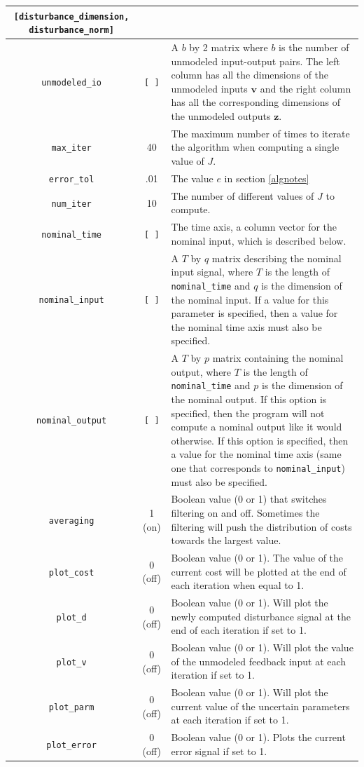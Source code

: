 \documentclass{article}
\begin{document}
\begin{table}[H]
\begin{center}
\begin{tabular}{| c | c | p{9cm} |}
\texttt{[disturbance\_dimension, disturbance\_norm]} \\
\hline
\texttt{unmodeled\_io} & \texttt{[ ]} & A $b$ by 2 matrix where $b$ is the
number of unmodeled input-output pairs. The left column has all the dimensions
of the unmodeled inputs $\mathbf{v}$ and the right column has all the
corresponding dimensions of the unmodeled outputs $\mathbf{z}$.\\
\hline
\texttt{max\_iter} & 40 & The maximum number of times to iterate the algorithm
when computing a single value of $J$.\\
\hline
\texttt{error\_tol} & .01 & The value $e$ in section \ref{algnotes} \\
\hline
\texttt{num\_iter} & 10 & The number of different values of $J$ to compute. \\
\hline
\texttt{nominal\_time} & \texttt{[ ]} & The time axis, a column vector for the
nominal input, which is described below. \\
\hline
\texttt{nominal\_input} & \texttt{[ ]} & A $T$ by $q$ matrix describing the
nominal input signal, where $T$ is the length of \texttt{nominal\_time} and $q$
is the dimension of the nominal input. If a value for this parameter is
specified, then a value for the nominal time axis must also be specified. \\
\hline
\texttt{nominal\_output} & \texttt{[ ]} & A $T$ by $p$ matrix containing the
nominal output, where $T$ is the length of \texttt{nominal\_time} and $p$ is the
dimension of the nominal output. If this option is specified, then the program
will not compute a nominal output like it would otherwise. If this option is
specified, then a value for the nominal time axis (same one that corresponds to
\texttt{nominal\_input}) must also be specified.\\
\hline
\texttt{averaging} & 1 (on) & Boolean value (0 or 1) that switches filtering on
and off. Sometimes the filtering will push the distribution of costs towards the
largest value.\\
\hline
\texttt{plot\_cost} & 0 (off) & Boolean value (0 or 1). The value of the current
cost will be plotted at the end of each iteration when equal to 1. \\
\hline
\texttt{plot\_d} & 0 (off) & Boolean value (0 or 1). Will plot the newly
computed disturbance signal at the end of each iteration if set to 1. \\
\hline
\texttt{plot\_v} & 0 (off) & Boolean value (0 or 1). Will plot the value of the
unmodeled feedback input at each iteration if set to 1. \\
\hline
\texttt{plot\_parm} & 0 (off) & Boolean value (0 or 1). Will plot the current
value of the uncertain parameters at each iteration if set to 1. \\
\hline
\texttt{plot\_error} & 0 (off) & Boolean value (0 or 1). Plots the current error
signal if set to 1. \\
\hline
\end{tabular}
\label{inputparameters}
\end{center}
\end{table}
\end{document}
